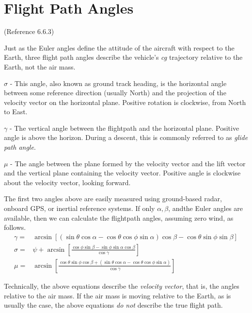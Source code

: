 \documentclass[
]{book}
\providecommand{\tightlist}{%
  \setlength{\itemsep}{0pt}\setlength{\parskip}{0pt}}
\begin{document}
\hypertarget{flight-path-angles}{%
\section{Flight Path Angles}\label{flight-path-angles}}

(Reference 6.6.3)

Just as the Euler angles define the attitude of the aircraft with respect to the Earth, three flight path angles describe the vehicle's \emph{cg} trajectory relative to the Earth, not the air mass.

\begin{description}
\tightlist
\item[Flight path heading angle]
\(\sigma\) - This angle, also known as ground track heading, is the horizontal angle between some reference direction (usually North) and the projection of the velocity vector on the horizontal plane. Positive rotation is clockwise, from North to East.
\item[Flight path elevation angle]
\(\gamma\) - The vertical angle between the flightpath and the horizontal plane. Positive angle is above the horizon. During a descent, this is commonly referred to as \emph{glide path angle}.
\item[Flight path bank angle]
\(\mu\) - The angle between the plane formed by the velocity vector and the lift vector and the vertical plane containing the velocity vector. Positive angle is clockwise about the velocity vector, looking forward.
\end{description}

The first two angles above are easily measured using ground-based radar, onboard GPS, or inertial reference systems. If only \(\alpha, \beta\), andthe Euler angles are available, then we can calculate the flightpath angles, assuming zero wind, as follows.
\[
\begin{align}
\gamma =& \arcsin [(\sin\theta  \cos\alpha - \cos\theta  \cos\phi  \sin\alpha) \cos\beta - \cos\theta  \sin\phi  \sin\beta] \\
\sigma =& \psi + \arcsin \left[\frac{\cos\phi \sin\beta - \sin\phi \sin\alpha \cos\beta}{\cos\gamma} \right]\\
\mu =& \arcsin\left[ \frac{\cos\theta \sin\phi \cos\beta + 
(\sin\theta \cos\alpha -\cos\theta \cos\phi \sin\alpha)}{\cos\gamma}  \right]
\end{align}
\]

Technically, the above equations describe the \emph{velocity vector}, that is, the angles relative to the air mass. If the air mass is moving relative to the Earth, as is usually the case, the above equations \emph{do not} describe the true flight path.
\end{document}
